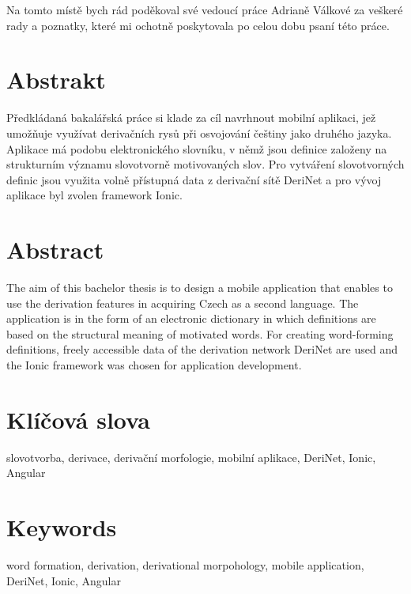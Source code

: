 \documentclass[a4paper,12pt,openany,twoside]{book} %
\begin{document}
\par
\par\vspace*{\fill}

Na tomto místě bych rád poděkoval své vedoucí práce Adrianě Válkové za veškeré rady a poznatky, které mi ochotně poskytovala po celou dobu psaní této práce.

\clearpage

\section*{Abstrakt}
  
Předkládaná bakalářská práce si klade za cíl navrhnout mobilní aplikaci, jež umožňuje využívat derivačních rysů při osvojování češtiny jako druhého jazyka. Aplikace má podobu elektronického slovníku, v němž jsou definice založeny na strukturním významu slovotvorně motivovaných slov. Pro vytváření slovotvorných definic jsou využita volně přístupná data z derivační sítě DeriNet a pro vývoj aplikace byl zvolen framework Ionic.

\section*{Abstract}

The aim of this bachelor thesis is to design a mobile application that enables to use the derivation features in acquiring Czech as a second language. The application is in the form of an electronic dictionary in which definitions are based on the structural meaning of motivated words. For creating word-forming definitions, freely accessible data of the derivation network DeriNet are used and the Ionic framework was chosen for application development.

\section*{Klíčová slova}

slovotvorba, derivace, derivační morfologie, mobilní aplikace, DeriNet, Ionic, Angular

\section*{Keywords}

word formation, derivation, derivational morpohology, mobile application, DeriNet, Ionic, Angular

\clearpage

\tableofcontents


\cleardoublepage
{}





\clearpage

\pagestyle{plain}

\begin{spacing}{1.05}
\printbibliography[title={Seznam literatury}]
\end{spacing}
\end{document}

